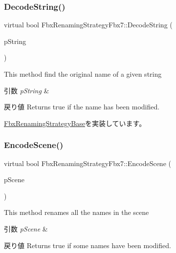 \subsubsection{\texorpdfstring{Decode\+String()}{DecodeString()}}
{\footnotesize\ttfamily virtual bool Fbx\+Renaming\+Strategy\+Fbx7\+::\+Decode\+String (\begin{DoxyParamCaption}\item[{\hyperlink{class_fbx_name_handler}{Fbx\+Name\+Handler} \&}]{p\+String }\end{DoxyParamCaption})\hspace{0.3cm}{\ttfamily [virtual]}}

This method find the original name of a given string 
\begin{DoxyParams}{引数}
{\em p\+String} & \\
\hline
\end{DoxyParams}
\begin{DoxyReturn}{戻り値}
Returns true if the name has been modified. 
\end{DoxyReturn}


\hyperlink{class_fbx_renaming_strategy_base_acc30037744da35fa2b59fdd4ff6d9ede}{Fbx\+Renaming\+Strategy\+Base}を実装しています。

\mbox{\label{class_fbx_renaming_strategy_fbx7_a9c3d4574319c2e744a80d66f6c7c0ae3}} 
\subsubsection{\texorpdfstring{Encode\+Scene()}{EncodeScene()}}
{\footnotesize\ttfamily virtual bool Fbx\+Renaming\+Strategy\+Fbx7\+::\+Encode\+Scene (\begin{DoxyParamCaption}\item[{\hyperlink{class_fbx_scene}{Fbx\+Scene} $\ast$}]{p\+Scene }\end{DoxyParamCaption})\hspace{0.3cm}{\ttfamily [virtual]}}

This method renames all the names in the scene 
\begin{DoxyParams}{引数}
{\em p\+Scene} & \\
\hline
\end{DoxyParams}
\begin{DoxyReturn}{戻り値}
Returns true if some names have been modified. 
\end{DoxyReturn}


